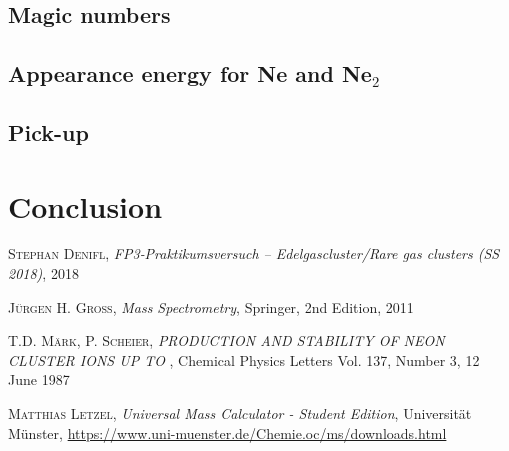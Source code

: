 \documentclass[a4paper,10pt]{article}
\begin{document}
\subsection{Magic numbers}
\subsection{Appearance energy for Ne and Ne$_2$}
\subsection{Pick-up}
\section{Conclusion}

\begin{thebibliography}{99}

\textsc{Stephan Denifl}, \textit{FP3‐Praktikumsversuch – Edelgascluster/Rare gas clusters (SS 2018)}, 2018

\textsc{Jürgen H. Gross}, \textit{Mass Spectrometry}, Springer, 2nd Edition, 2011

\textsc{T.D. Märk, P. Scheier}, \textit{PRODUCTION AND STABILITY OF NEON CLUSTER IONS UP TO }, Chemical Physics Letters Vol. 137, Number 3, 12 June 1987

\textsc{Matthias Letzel}, \textit{Universal Mass Calculator - Student Edition}, Universität Münster, \url{https://www.uni-muenster.de/Chemie.oc/ms/downloads.html}


\end{thebibliography}
\end{document}

